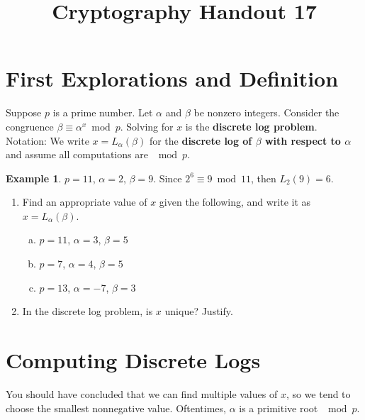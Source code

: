 \documentclass[12pt]{amsart}
\makeatletter
\def\subtitle#1{\gdef\@subtitle{#1}}
\def\@subtitle{}
\theoremstyle{plain}
\theoremstyle{definition}
\newtheorem*{ex}{Example}
\theoremstyle{remark}
\makeatother
\begin{document}
\onehalfspacing

\title[]{Cryptography Handout 17}
\subtitle{Discrete Log}
\maketitle

\section{First Explorations and Definition}
\begin{framed}
Suppose $p$ is a prime number.  Let $\alpha$ and $\beta$ be nonzero integers. Consider the congruence $\beta \equiv \alpha ^x \bmod p$. Solving for $x$ is the \textbf{discrete log problem}.\\

Notation: We write $x = L_{\alpha}(\beta)$ for the \textbf{discrete log of $\beta$ with respect to $\alpha$} and assume all computations are $\mod p$.
\end{framed}

\begin{ex}
$p = 11$, $\alpha = 2$, $\beta = 9$. Since $2^6 \equiv 9 \bmod 11$, then $L_{2}(9) = 6$.
\end{ex}

\begin{enumerate}[1.]
	\item Find an appropriate value of $x$ given the following, and write it as $x = L_{\alpha}(\beta)$.
		\begin{enumerate}[a.]
			\item $p = 11$, $\alpha = 3$, $\beta = 5$\\ \vspace{.3in}
			\item $p = 7$, $\alpha = 4$, $\beta = 5$\\ \vspace{.3in}
			\item $p = 13$, $\alpha = -7$, $\beta = 3$\\ \vspace{.3in} 
		\end{enumerate}
	\item In the discrete log problem, is $x$ unique? Justify.\\
\end{enumerate}

\newpage \section{Computing Discrete Logs}
You should have concluded that we can find multiple values of $x$, so we tend to choose the smallest nonnegative value.  Oftentimes, $\alpha$ is a primitive root $\mod p$.
\end{document}
